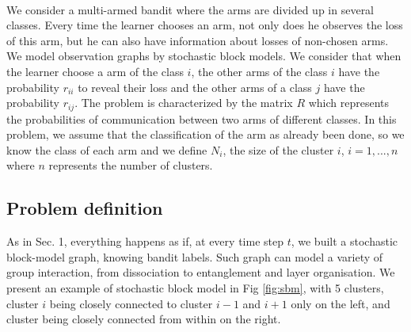 \documentclass[11pt,a4paper]{article}
\begin{document}
\paragraph{}We consider a multi-armed bandit where the arms are divided up in several classes. Every time the learner chooses an arm, not only does he observes the loss of this arm, but he can also have information about losses of non-chosen arms. We model observation graphs by stochastic block models. We consider that when the learner choose a arm of the class $i$, the other arms of the class $i$ have the probability $r_{ii}$ to reveal their loss and the other arms of a class $j$ have the probability $r_{ij}$. The problem is characterized by the matrix $R$ which represents the probabilities of communication between two arms of different classes. In this problem, we assume that the classification of the arm as already been done, so we know the class of each arm and we define $N_i$, the size of the cluster $i$, $i=1,...,n$ where $n$ represents the number of clusters.

\subsection{Problem definition}

As in Sec. 1, everything happens as if, at every time step $t$, we built a stochastic block-model graph, knowing bandit labels. Such graph can model a variety of group interaction, from dissociation to entanglement and layer organisation. We present an example of stochastic block model in Fig \ref{fig:sbm}, with 5 clusters, cluster $i$ being closely connected to cluster $i-1$ and $i+1$ only on the left, and cluster being closely connected from within on the right.
\end{document}

